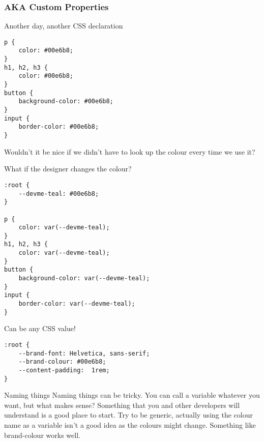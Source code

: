 \subsubsection{AKA Custom Properties}

Another day, another CSS declaration

\begin{verbatim}
p {
	color: #00e6b8;
}
h1, h2, h3 {
	color: #00e6b8;
}
button {
	background-color: #00e6b8;
}
input {
	border-color: #00e6b8;
}
\end{verbatim}

Wouldn't it be nice if we didn't have to look up the colour every time we use it?

What if the designer changes the colour?

\begin{verbatim}
:root {
	--devme-teal: #00e6b8;
}

p {
	color: var(--devme-teal);
}
h1, h2, h3 {
	color: var(--devme-teal);
}
button {
	background-color: var(--devme-teal);
}
input {
	border-color: var(--devme-teal);
}
\end{verbatim}

Can be any CSS value!

\begin{verbatim}
:root {
	--brand-font: Helvetica, sans-serif;
	--brand-colour: #00e6b8;
	--content-padding:	1rem;
}
\end{verbatim}

\begin{infobox}{Naming things}
    Naming things can be tricky. You can call a variable whatever you want, but what makes sense? Something that you and other developers will understand is a good place to start. Try to be generic, actually using the colour name as a variable isn't a good idea as the colours might change. Something like brand-colour works well.
\end{infobox}

